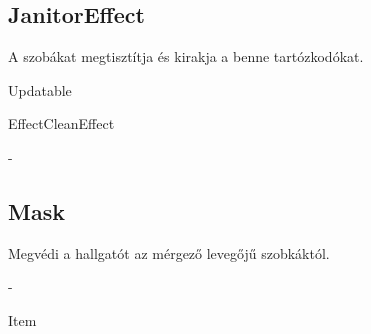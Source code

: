 \subsection{JanitorEffect}
\begin{class-template-responsibility}
    A szobákat megtisztítja és kirakja a benne tartózkodókat.
\end{class-template-responsibility}
\begin{class-template-interface}
    Updatable
\end{class-template-interface}
\begin{class-template-baseclass}
    Effect\baseclass CleanEffect
\end{class-template-baseclass}
\begin{class-template-attribute}
    -
\end{class-template-attribute}
\begin{class-template-method}
\end{class-template-method}

\subsection{Mask}
\begin{class-template-responsibility}
    Megvédi a hallgatót az mérgező levegőjű szobkáktól.
\end{class-template-responsibility}
\begin{class-template-interface}
    -
\end{class-template-interface}
\begin{class-template-baseclass}
    Item
\end{class-template-baseclass}
\begin{class-template-attribute}
\end{class-template-attribute}
\begin{class-template-method}
\end{class-template-method}

